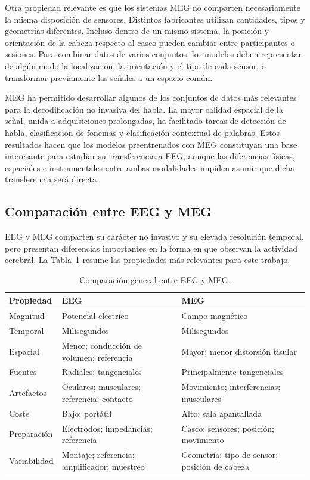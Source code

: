 Otra propiedad relevante es que los sistemas MEG no comparten necesariamente la misma disposición de sensores. Distintos fabricantes utilizan cantidades, tipos y geometrías diferentes. Incluso dentro de un mismo sistema, la posición y orientación de la cabeza respecto al casco pueden cambiar entre participantes o sesiones. Para combinar datos de varios conjuntos, los modelos deben representar de algún modo la localización, la orientación y el tipo de cada sensor, o transformar previamente las señales a un espacio común.

MEG ha permitido desarrollar algunos de los conjuntos de datos más relevantes para la decodificación no invasiva del habla. La mayor calidad espacial de la señal, unida a adquisiciones prolongadas, ha facilitado tareas de detección de habla, clasificación de fonemas y clasificación contextual de palabras. Estos resultados hacen que los modelos preentrenados con MEG constituyan una base interesante para estudiar su transferencia a EEG, aunque las diferencias físicas, espaciales e instrumentales entre ambas modalidades impiden asumir que dicha transferencia será directa.


\subsection{Comparación entre EEG y MEG}

EEG y MEG comparten su carácter no invasivo y su elevada resolución temporal, pero presentan diferencias importantes en la forma en que observan la actividad cerebral. La Tabla~\ref{tab:eeg_meg_comparison} resume las propiedades más relevantes para este trabajo.

\begin{table}[htbp]
\centering
\caption{Comparación general entre EEG y MEG.}
\label{tab:eeg_meg_comparison}
\small
\setlength{\tabcolsep}{5pt}
\renewcommand{\arraystretch}{1.15}
\begin{tabularx}{\textwidth}{
    >{\raggedright\arraybackslash}p{2.4cm}
    >{\raggedright\arraybackslash}X
    >{\raggedright\arraybackslash}X
}
\toprule
\textbf{Propiedad} & \textbf{EEG} & \textbf{MEG} \\
\midrule
Magnitud & Potencial eléctrico & Campo magnético \\
Temporal & Milisegundos & Milisegundos \\
Espacial & Menor; conducción de volumen; referencia & Mayor; menor distorsión tisular \\
Fuentes & Radiales; tangenciales & Principalmente tangenciales \\
Artefactos & Oculares; musculares; referencia; contacto & Movimiento; interferencias; musculares \\
Coste & Bajo; portátil & Alto; sala apantallada \\
Preparación & Electrodos; impedancias; referencia & Casco; sensores; posición; movimiento \\
Variabilidad & Montaje; referencia; amplificador; muestreo & Geometría; tipo de sensor; posición de cabeza \\
\bottomrule
\end{tabularx}
\end{table}

